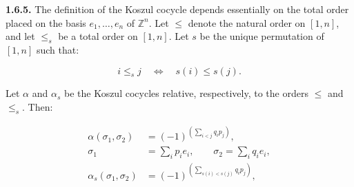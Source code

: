 \noindent\textbf{1.6.5.}\quad
The definition of the Koszul cocycle depends essentially on the total
order placed on the basis $e_1,\ldots,e_n$ of $\mathbb Z^n$. Let
$\leq$ denote the natural order on $[1,n]$, and let $\leq_s$ be a total
order on $[1,n]$. Let $s$ be the unique permutation of $[1,n]$ such
that:

\begin{equation}
  i\leq_s j\quad\Longleftrightarrow\quad s(i)\leq s(j).
  \tag{1.6.5.1}
\end{equation}

Let $\alpha$ and $\alpha_s$ be the Koszul cocycles relative,
respectively, to the orders $\leq$ and $\leq_s$. Then:

\begin{equation}
  \begin{aligned}
    \alpha(\sigma_1,\sigma_2)
      &=(-1)^{\left(\sum_{i<j}q_i p_j\right)},\\
    \sigma_1&=\sum_i p_i e_i,
      \qquad \sigma_2=\sum_i q_i e_i,\\
    \alpha_s(\sigma_1,\sigma_2)
      &=(-1)^{\left(\sum_{s(i)<s(j)}q_i p_j\right)},
  \end{aligned}
  \tag{1.6.5.2}
\end{equation}
